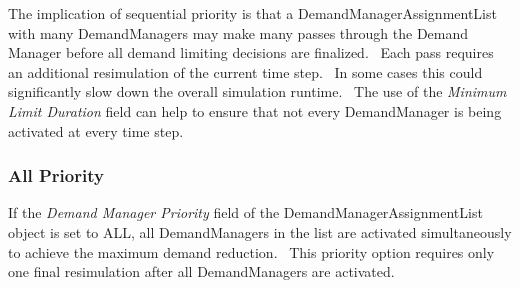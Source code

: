 The implication of sequential priority is that a DemandManagerAssignmentList with many DemandManagers may make many passes through the Demand Manager before all demand limiting decisions are finalized.~ Each pass requires an additional resimulation of the current time step.~ In some cases this could significantly slow down the overall simulation runtime.~ The use of the \emph{Minimum Limit Duration} field can help to ensure that not every DemandManager is being activated at every time step.

\subsubsection{All Priority}\label{all-priority}

If the \emph{Demand Manager Priority} field of the DemandManagerAssignmentList object is set to ALL, all DemandManagers in the list are activated simultaneously to achieve the maximum demand reduction.~ This priority option requires only one final resimulation after all DemandManagers are activated.

